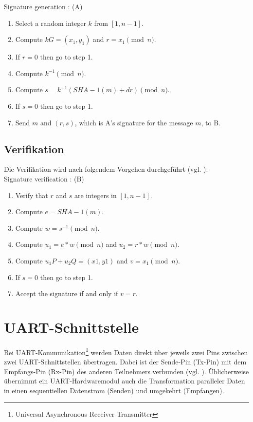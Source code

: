 Signature generation : (A)
\begin{enumerate}
\item Select a random integer $k$ from $[1, n - 1]$.
\item Compute $k G = (x_1, y_1)$ and $r = x_1 \pmod{n} $.
\item If $r = 0$ then go to step 1.
\item Compute $k^{-1} \pmod{n}$.
\item Compute $s = k^{-1}(SHA - 1(m) + dr)\pmod{n}$.
\item If $s = 0$ then go to step 1.
\item Send $m$ and $(r, s)$, which is A’s signature for the message $m$, to B.
\end{enumerate}

\subsection{Verifikation}

Die Verifikation wird nach folgendem Vorgehen durchgeführt (vgl. \cite{hwimp}):\\

Signature verification : (B)
\begin{enumerate}
\item Verify that $r$ and $s$ are integers in $[1, n - 1]$.
\item Compute $e = SHA - 1(m)$.
\item Compute $w = s^{-1}\pmod{n}$.
\item Compute $u_1 = e * w \pmod{n}$ and $u_2 = r * w \pmod{n}$.
\item Compute $u_1 P + u_2 Q = (x1, y1)$ and $v = x_1 \pmod{n}$.
\item If $s = 0$ then go to step 1.
\item Accept the signature if and only if $v = r$.
\end{enumerate}






\section{UART-Schnittstelle}

Bei UART-Kommunikation\footnote{Universal Asynchronous Receiver Transmitter} werden Daten direkt über jeweils zwei Pins zwischen zwei UART-Schnittstellen übertragen. Dabei ist der Sende-Pin (Tx-Pin) mit dem Empfangs-Pin (Rx-Pin) des anderen Teilnehmers verbunden (vgl. \cite{uart}). Üblicherweise übernimmt ein UART-Hardwaremodul auch die Transformation paralleler Daten in einen sequentiellen Datenstrom (Senden) und umgekehrt (Empfangen). \\

